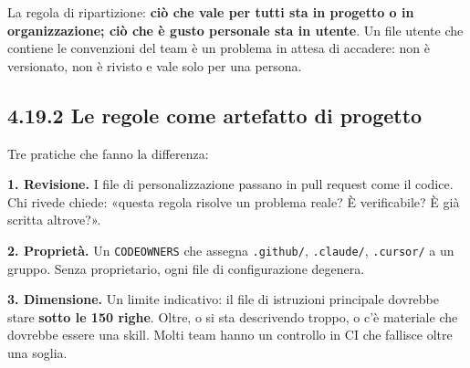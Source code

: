 \documentclass[
  italian,
  10pt,
]{book}
\newenvironment{Shaded}{\begin{snugshade}}{\end{snugshade}}
\newcommand{\ControlFlowTok}[1]{\textcolor[rgb]{0.13,0.29,0.53}{\textbf{#1}}}
\newcommand{\DecValTok}[1]{\textcolor[rgb]{0.00,0.00,0.81}{#1}}
\newcommand{\FunctionTok}[1]{\textcolor[rgb]{0.13,0.29,0.53}{\textbf{#1}}}
\newcommand{\NormalTok}[1]{#1}
\newcommand{\OperatorTok}[1]{\textcolor[rgb]{0.81,0.36,0.00}{\textbf{#1}}}
\newcommand{\StringTok}[1]{\textcolor[rgb]{0.31,0.60,0.02}{#1}}
\newcommand{\VariableTok}[1]{\textcolor[rgb]{0.00,0.00,0.00}{#1}}
\begin{document}
La regola di ripartizione: \textbf{ciò che vale per tutti sta in
progetto o in organizzazione; ciò che è gusto personale sta in utente}.
Un file utente che contiene le convenzioni del team è un problema in
attesa di accadere: non è versionato, non è rivisto e vale solo per una
persona.

\subsection{4.19.2 Le regole come artefatto di
progetto}\label{le-regole-come-artefatto-di-progetto}

Tre pratiche che fanno la differenza:

\textbf{1. Revisione.} I file di personalizzazione passano in pull
request come il codice. Chi rivede chiede: «questa regola risolve un
problema reale? È verificabile? È già scritta altrove?».

\textbf{2. Proprietà.} Un \texttt{CODEOWNERS} che assegna
\texttt{.github/}, \texttt{.claude/}, \texttt{.cursor/} a un gruppo.
Senza proprietario, ogni file di configurazione degenera.

\textbf{3. Dimensione.} Un limite indicativo: il file di istruzioni
principale dovrebbe stare \textbf{sotto le 150 righe}. Oltre, o si sta
descrivendo troppo, o c'è materiale che dovrebbe essere una skill. Molti
team hanno un controllo in CI che fallisce oltre una soglia.

\begin{Shaded}
\end{Shaded}
\end{document}
